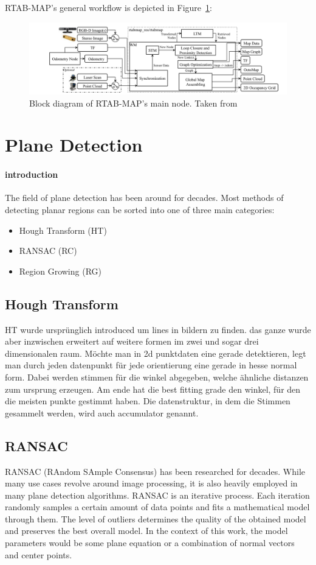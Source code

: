 \documentclass[main.tex]{subfiles}
\begin{document}
RTAB-MAP's general workflow is depicted in Figure~\ref{fig:rtabmap}:
\begin{figure}[!h]
    \centering
    \includegraphics[width=15 cm]{images/rtabmap.png}
    \caption{Block diagram of RTAB-MAP's main node. Taken from \cite[Figure~1]{Labbé_Michaud_2019}}
    \label{fig:rtabmap}
\end{figure}

\section{Plane Detection}

\paragraph*{introduction}
The field of plane detection has been around for decades. Most methods of detecting planar regions can be sorted into one of three main categories:
\begin{itemize}
    \item Hough Transform (HT)
    \item RANSAC (RC)
    \item Region Growing (RG)
\end{itemize}

\subsection*{Hough Transform}
HT wurde ursprünglich introduced um lines in bildern zu finden. das ganze wurde aber inzwischen erweitert auf weitere 
formen im zwei und sogar drei dimensionalen raum.
Möchte man in 2d punktdaten eine gerade detektieren, legt man durch jeden datenpunkt für jede orientierung eine gerade in hesse normal form. Dabei werden stimmen für 
die winkel abgegeben, welche ähnliche distanzen zum ursprung erzeugen. Am ende hat die best fitting grade den winkel, für den die meisten punkte gestimmt haben.
Die datenstruktur, in dem die Stimmen gesammelt werden, wird auch accumulator genannt.


\subsection*{RANSAC}
RANSAC (RAndom SAmple Consensus) has been researched for decades. While many use cases revolve around image processing, it is also heavily employed in many plane detection algorithms\cite{Sun_Mordohai_2019,Yang_Forstner,Ashraf_Ahmed_2017}.
RANSAC is an iterative process. Each iteration randomly samples a certain amount of data points and fits a mathematical model through them. The level of outliers determines the quality of the obtained model and preserves the best overall model.
In the context of this work, the model parameters would be some plane equation or a combination of normal vectors and center points.
\end{document}
